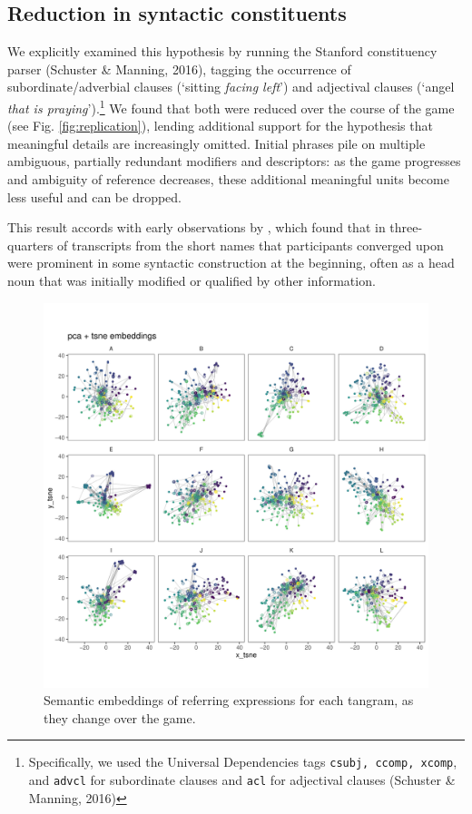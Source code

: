 \documentclass[alpha-refs]{wiley-article}
\begin{document}
\subsection{Reduction in syntactic constituents}
We explicitly examined this hypothesis by running the Stanford
constituency parser (Schuster \& Manning, 2016), tagging the occurrence
of subordinate/adverbial clauses (`sitting \emph{facing left}') and
adjectival clauses (`angel \emph{that is praying}').\footnote{Specifically,
  we used the Universal Dependencies tags \texttt{csubj, ccomp, xcomp},
  and \texttt{advcl} for subordinate clauses and \texttt{acl} for
  adjectival clauses (Schuster \& Manning, 2016)} We found that both
were reduced over the course of the game (see Fig.
\ref{fig:replication}), lending additional support for the hypothesis
that meaningful details are increasingly omitted. Initial phrases pile
on multiple ambiguous, partially redundant modifiers and descriptors: as
the game progresses and ambiguity of reference decreases, these
additional meaningful units become less useful and can be dropped.

This result accords with early observations by \cite{Carroll80_NamingHedges}, which found that in three-quarters of transcripts from \cite{KraussWeinheimer64_ReferencePhrases} the short names that participants converged upon were prominent in some syntactic construction at the beginning, often as a head noun that was initially modified or qualified by other information. 

\begin{figure}[t]
\centering
\includegraphics[scale=.3]{tsne_embeddings.pdf}
\caption{Semantic embeddings of referring expressions for each tangram, as they change over the game. }
\label{fig:reduction}
\end{figure}
\end{document}
